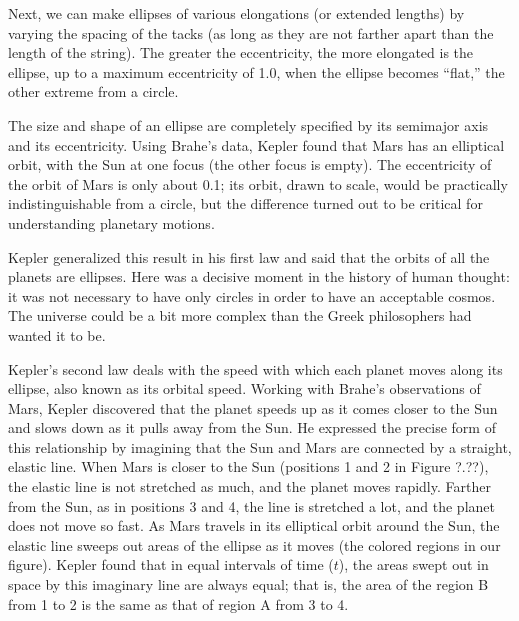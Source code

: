 \documentclass[../../main-astronomy.tex]{subfiles}
\begin{document}
Next, we can make ellipses of various elongations (or extended lengths) by varying the spacing of the tacks (as long as they are not farther apart than the length of the string). The greater the eccentricity, the more elongated is the ellipse, up to a maximum eccentricity of 1.0, when the ellipse becomes ``flat,'' the other extreme from a circle.

\vspace{1em}

The size and shape of an ellipse are completely specified by its semimajor axis and its eccentricity. Using Brahe's data, Kepler found that Mars has an elliptical orbit, with the Sun at one focus (the other focus is empty). The eccentricity of the orbit of Mars is only about 0.1; its orbit, drawn to scale, would be practically indistinguishable from a circle, but the difference turned out to be critical for understanding planetary motions.

\vspace{1em}

Kepler generalized this result in his first law and said that the orbits of all the planets are ellipses. Here was a decisive moment in the history of human thought: it was not necessary to have only circles in order to have an acceptable cosmos. The universe could be a bit more complex than the Greek philosophers had wanted it to be.

\vspace{1em}

Kepler's second law deals with the speed with which each planet moves along its ellipse, also known as its orbital speed. Working with Brahe's observations of Mars, Kepler discovered that the planet speeds up as it comes closer to the Sun and slows down as it pulls away from the Sun. He expressed the precise form of this relationship by imagining that the Sun and Mars are connected by a straight, elastic line. When Mars is closer to the Sun (positions 1 and 2 in Figure ?.??), the elastic line is not stretched as much, and the planet moves rapidly. Farther from the Sun, as in positions 3 and 4, the line is stretched a lot, and the planet does not move so fast. As Mars travels in its elliptical orbit around the Sun, the elastic line sweeps out areas of the ellipse as it moves (the colored regions in our figure). Kepler found that in equal intervals of time ($t$), the areas swept out in space by this imaginary line are always equal; that is, the area of the region B from 1 to 2 is the same as that of region A from 3 to 4.
\end{document}
